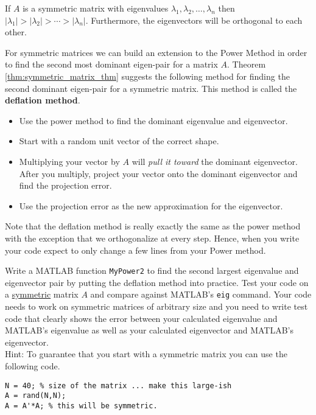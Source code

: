 \begin{thm}\label{thm:symmetric_matrix_thm}
    If $A$ is a symmetric matrix with eigenvalues $\lambda_1, \lambda_2, \ldots,
    \lambda_n$ then $|\lambda_1| > |\lambda_2| > \cdots > |\lambda_n|$.  Furthermore, the
    eigenvectors will be orthogonal to each other. 
\end{thm}


\begin{problem}
    For symmetric matrices we can build an extension to the Power Method in order
    to find the second most dominant eigen-pair for a matrix $A$.  Theorem
    \ref{thm:symmetric_matrix_thm} suggests the following method for finding the second
    dominant eigen-pair for a symmetric matrix.  This method is called the {\bf deflation
    method}.
    \begin{itemize}
        \item Use the power method to find the dominant eigenvalue and eigenvector.
        \item Start with a random unit vector of the correct shape.
        \item Multiplying your vector by $A$ will {\it pull it toward} the dominant
            eigenvector.  After you multiply, project your vector onto the dominant
            eigenvector and find the projection error.  
        \item Use the projection error as the new approximation for the eigenvector.
    \end{itemize}    

    Note that the deflation method is really exactly the same as the power method with the
    exception that we orthogonalize at every step.  Hence, when you write your code expect
    to only change a few lines from your Power method.

    Write a
    MATLAB function \texttt{MyPower2} to find the second largest eigenvalue and
    eigenvector pair by putting the deflation method into practice. Test your code on a
    \underline{symmetric} matrix $A$ and compare against MATLAB's \texttt{eig} command.
    Your code needs to work on symmetric matrices of arbitrary size and you need to write
    test code that clearly shows the error between your calculated eigenvalue and MATLAB's
    eigenvalue as well as your calculated eigenvector and MATLAB's eigenvector.\\ Hint: To
    guarantee that you start with a symmetric matrix you can use the following code.
\begin{verbatim}
N = 40; % size of the matrix ... make this large-ish
A = rand(N,N);
A = A'*A; % this will be symmetric.
\end{verbatim}
\end{problem}

